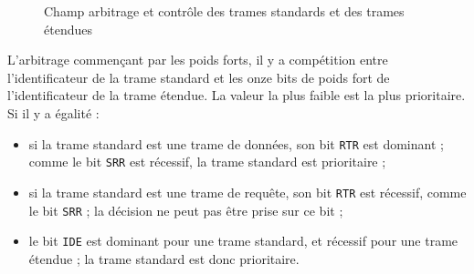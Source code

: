 \begin{figure}[h]
  \centering
  \caption{Champ arbitrage et contrôle des trames standards et des trames étendues}
\end{figure}

L'arbitrage commençant par les poids forts, il y a compétition entre l'identificateur de la trame standard et les onze bits de poids fort de l'identificateur de la trame étendue. La valeur la plus faible est la plus prioritaire. Si il y a égalité :
\begin{itemize}
  \item si la trame standard est une trame de données, son bit \texttt{RTR} est dominant ; comme le bit \texttt{SRR} est récessif, la trame standard est prioritaire ;
  \item si la trame standard est une trame de requête, son bit \texttt{RTR} est récessif, comme le bit \texttt{SRR} ; la décision ne peut pas être prise sur ce bit ;
  \item le bit \texttt{IDE} est dominant pour une trame standard, et récessif pour une trame étendue ; la trame standard est donc prioritaire.
\end{itemize}

